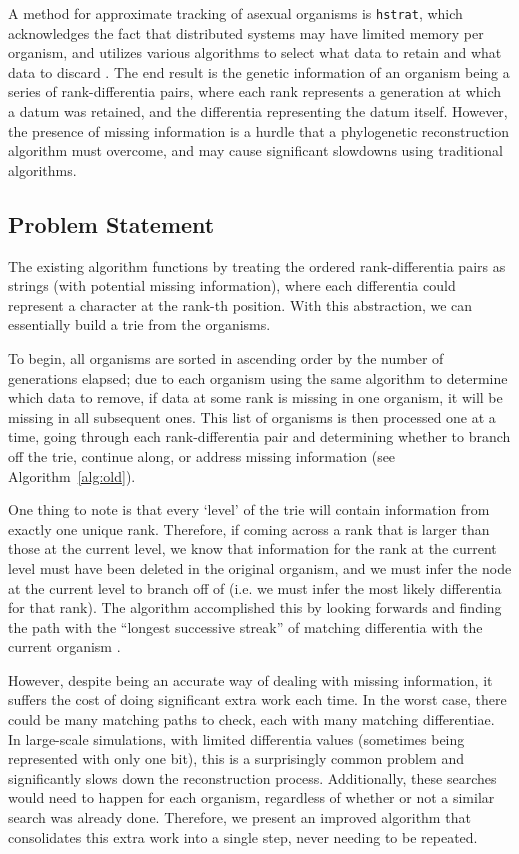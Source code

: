 A method for approximate tracking of asexual organisms is \texttt{hstrat}, which acknowledges the fact that distributed systems may have limited memory per organism, and utilizes various algorithms to select what data to retain and what data to discard \citep{moreno2022hstrat}. The end result is the genetic information of an organism being a series of rank-differentia pairs, where each rank represents a generation at which a datum was retained, and the differentia representing the datum itself. However, the presence of missing information is a hurdle that a phylogenetic reconstruction algorithm must overcome, and may cause significant slowdowns using traditional algorithms.

\subsection{Problem Statement} \label{sec:introduction:problem}

The existing algorithm functions by treating the ordered rank-differentia pairs as strings (with potential missing information), where each differentia could represent a character at the rank-th position. With this abstraction, we can essentially build a trie \citep{fredkin1960trie} from the organisms. 

To begin, all organisms are sorted in ascending order by the number of generations elapsed; due to each organism using the same algorithm to determine which data to remove, if data at some rank is missing in one organism, it will be missing in all subsequent ones. This list of organisms is then processed one at a time, going through each rank-differentia pair and determining whether to branch off the trie, continue along, or address missing information (see Algorithm~\ref{alg:old}). 

One thing to note is that every `level' of the trie will contain information from exactly one unique rank. Therefore, if coming across a rank that is larger than those at the current level, we know that information for the rank at the current level must have been deleted in the original organism, and we must infer the node at the current level to branch off of (i.e. we must infer the most likely differentia for that rank). The algorithm accomplished this by looking forwards and finding the path with the ``longest successive streak'' of matching differentia with the current organism \citep{moreno2024analysis}.



However, despite being an accurate way of dealing with missing information, it suffers the cost of doing significant extra work each time. In the worst case, there could be many matching paths to check, each with many matching differentiae. In large-scale simulations, with limited differentia values (sometimes being represented with only one bit), this is a surprisingly common problem and significantly slows down the reconstruction process. Additionally, these searches would need to happen for each organism, regardless of whether or not a similar search was already done. Therefore, we present an improved algorithm that consolidates this extra work into a single step, never needing to be repeated.